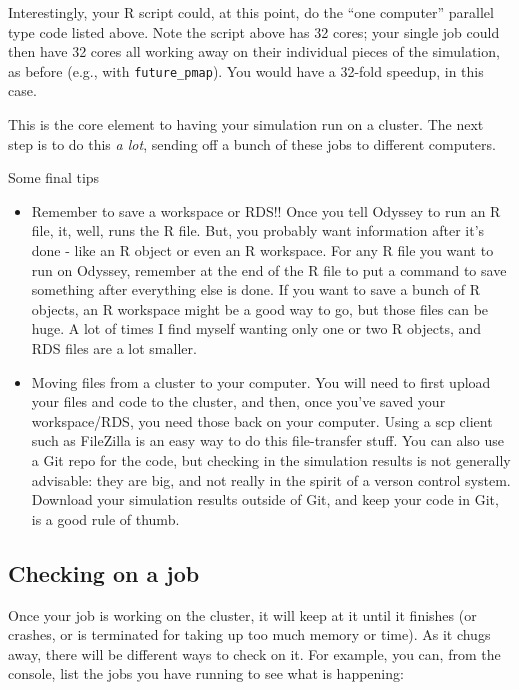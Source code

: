 \documentclass[
]{book}
\begin{document}
Interestingly, your R script could, at this point, do the ``one computer'' parallel type code listed above.
Note the script above has 32 cores; your single job could then have 32 cores all working away on their individual pieces of the simulation, as before (e.g., with \texttt{future\_pmap}).
You would have a 32-fold speedup, in this case.

This is the core element to having your simulation run on a cluster.
The next step is to do this \emph{a lot}, sending off a bunch of these jobs to different computers.

Some final tips

\begin{itemize}
\item
  Remember to save a workspace or RDS!! Once you tell Odyssey to run an R file, it, well, runs the R file. But, you probably want information after it's done - like an R object or even an R workspace. For any R file you want to run on Odyssey, remember at the end of the R file to put a command to save something after everything else is done. If you want to save a bunch of R objects, an R workspace might be a good way to go, but those files can be huge. A lot of times I find myself wanting only one or two R objects, and RDS files are a lot smaller.
\item
  Moving files from a cluster to your computer. You will need to first upload your files and code to the cluster, and then, once you've saved your workspace/RDS, you need those back on your computer. Using a scp client such as FileZilla is an easy way to do this file-transfer stuff. You can also use a Git repo for the code, but checking in the simulation results is not generally advisable: they are big, and not really in the spirit of a verson control system. Download your simulation results outside of Git, and keep your code in Git, is a good rule of thumb.
\end{itemize}

\hypertarget{checking-on-a-job}{%
\subsection{Checking on a job}\label{checking-on-a-job}}

Once your job is working on the cluster, it will keep at it until it finishes (or crashes, or is terminated for taking up too much memory or time).
As it chugs away, there will be different ways to check on it.
For example, you can, from the console, list the jobs you have running to see what is happening:
\end{document}
